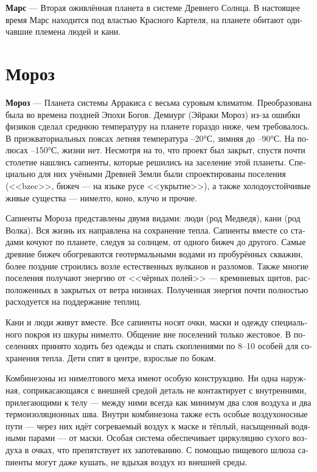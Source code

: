 \documentclass[a4paper,12pt,fleqn]{book}\usepackage{cooltooltips}\usepackage{polyglossia}\setdefaultlanguage[babelshorthands=true]{russian}\setotherlanguage{english}\defaultfontfeatures{Ligatures=TeX,Mapping=tex-text} \usepackage{xcolor}\definecolor{lightgray}{HTML}{bbbbbb}\color{lightgray}\newcommand{\ml}[3]{\textenglish{\textcolor{black}{#3}}}
\newcommand{\theterm}[3]{\textbf{\hypertarget{#1}{#2}} --- #3}
\begin{document}
\theterm{mars}
{Марс}
{Вторая оживлённая планета в системе Древнего Солнца.
В настоящее время Марс находится под властью Красного Картеля, на планете обитают одичавшие племена людей и кани.}

\section{Мороз}

\theterm{moros}
{Мороз}
{Планета системы Арракиса с весьма суровым климатом.
Преобразована была во времена поздней Эпохи Богов.
Демиург (Эйраки Мороз) из-за ошибки физиков сделал среднюю температуру на планете гораздо ниже, чем требовалось.
В приэкваториальных поясах летняя температура --20°С, зимняя до --90°С. На полюсах --150°С, жизни нет.
Несмотря на то, что проект был закрыт, спустя почти столетие нашлись сапиенты, которые решились на заселение этой планеты.
Специально для них учёными Древней Земли были спроектированы поселения (<<bzec>>, бижеч --- на языке русе <<укрытие>>), а также холодоустойчивые живые существа --- нимелто, коно, клучо и прочие.

Сапиенты Мороза представлены двумя видами: люди (род Медведя), кани (род Волка).
Вся жизнь их направлена на сохранение тепла.
Сапиенты вместе со стадами кочуют по планете, следуя за солнцем, от одного бижеч до другого.
Самые древние бижеч обогреваются геотермальными водами из пробурённых скважин, более поздние строились возле естественных вулканов и разломов.
Также многие поселения получают энергию от <<чёрных полей>> --- кремниевых щитов, расположенных в закрытых от ветра низинах.
Полученная энергия почти полностью расходуется на поддержание теплиц.

Кани и люди живут вместе.
Все сапиенты носят очки, маски и одежду специального покроя из шкуры нимелто.
Общение вне поселений только жестовое.
В поселениях принято ходить без одежды и спать скоплениями по 8--10 особей для сохранения тепла.
Дети спят в центре, взрослые по бокам.

Комбинезоны из нимелтового меха имеют особую конструкцию.
Ни одна наружная, соприкасающаяся с внешней средой деталь не контактирует с внутренними, прилегающими к телу --- между ними всегда как минимум два слоя воздуха и два термоизоляционных шва.
Внутри комбинезона также есть особые воздухоносные пути --- через них идёт согреваемый воздух к маске и тёплый, насыщенный водяными парами --- от маски.
Особая система обеспечивает циркуляцию сухого воздуха в очках, что препятствует их запотеванию.
С помощью пищевого шлюза сапиенты могут даже кушать, не вдыхая воздух из внешней среды.

}
\end{document}
